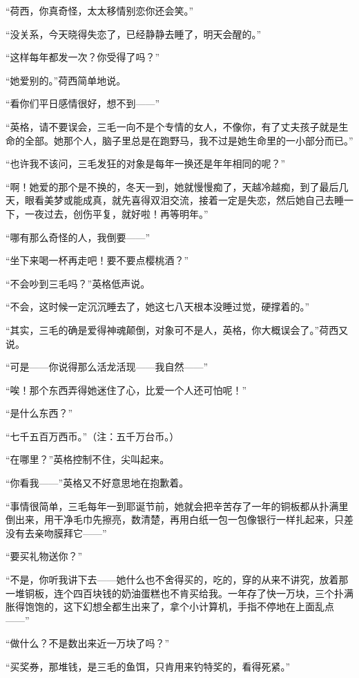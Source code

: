 \par “荷西，你真奇怪，太太移情别恋你还会笑。”
\par “没关系，今天晓得失恋了，已经静静去睡了，明天会醒的。”
\par “这样每年都发一次？你受得了吗？”
\par “她爱别的。”荷西简单地说。
\par “看你们平日感情很好，想不到——”
\par “英格，请不要误会，三毛一向不是个专情的女人，不像你，有了丈夫孩子就是生命的全部。她那个人，脑子里总是在跑野马，我不过是她生命里的一小部分而已。”
\par “也许我不该问，三毛发狂的对象是每年一换还是年年相同的呢？”
\par “啊！她爱的那个是不换的，冬天一到，她就慢慢痴了，天越冷越痴，到了最后几天，眼看美梦或能成真，就先喜得双泪交流，接着一定是失恋，然后她自己去睡一下，一夜过去，创伤平复，就好啦！再等明年。”
\par “哪有那么奇怪的人，我倒要——”
\par “坐下来喝一杯再走吧！要不要点樱桃酒？”
\par “不会吵到三毛吗？”英格低声说。
\par “不会，这时候一定沉沉睡去了，她这七八天根本没睡过觉，硬撑着的。”
\par “其实，三毛的确是爱得神魂颠倒，对象可不是人，英格，你大概误会了。”荷西又说。
\par “可是——你说得那么活龙活现——我自然——”
\par “唉！那个东西弄得她迷住了心，比爱一个人还可怕呢！”
\par “是什么东西？”
\par “七千五百万西币。”（注：五千万台币。）
\par “在哪里？”英格控制不住，尖叫起来。
\par “你看我——”英格又不好意思地在抱歉着。
\par “事情很简单，三毛每年一到耶诞节前，她就会把辛苦存了一年的铜板都从扑满里倒出来，用干净毛巾先擦亮，数清楚，再用白纸一包一包像银行一样扎起来，只差没有去亲吻膜拜它——”
\par “要买礼物送你？”
\par “不是，你听我讲下去——她什么也不舍得买的，吃的，穿的从来不讲究，放着那一堆铜板，连个四百块钱的奶油蛋糕也不肯买给我。一年存了快一万块，三个扑满胀得饱饱的，这下幻想全都生出来了，拿个小计算机，手指不停地在上面乱点——”
\par “做什么？不是数出来近一万块了吗？”
\par “买奖券，那堆钱，是三毛的鱼饵，只肯用来钓特奖的，看得死紧。”
